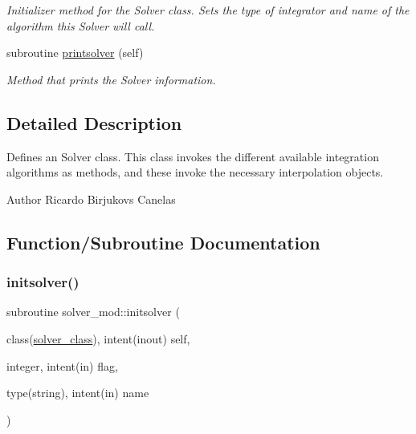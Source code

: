 \begin{DoxyCompactItemize}
\begin{DoxyCompactList}\small\item\em Initializer method for the Solver class. Sets the type of integrator and name of the algorithm this Solver will call. \end{DoxyCompactList}\item 
subroutine \mbox{\hyperlink{namespacesolver__mod_a54ea6899cce026a7a5da2dd05922628f}{printsolver}} (self)
\begin{DoxyCompactList}\small\item\em Method that prints the Solver information. \end{DoxyCompactList}\end{DoxyCompactItemize}


\subsection{Detailed Description}
Defines an Solver class. This class invokes the different available integration algorithms as methods, and these invoke the necessary interpolation objects. 

\begin{DoxyAuthor}{Author}
Ricardo Birjukovs Canelas 
\end{DoxyAuthor}


\subsection{Function/\+Subroutine Documentation}
\mbox{\label{namespacesolver__mod_a326292ff19880a914317109520b200b2}} 
\subsubsection{\texorpdfstring{initsolver()}{initsolver()}}
{\footnotesize\ttfamily subroutine solver\+\_\+mod\+::initsolver (\begin{DoxyParamCaption}\item[{class(\mbox{\hyperlink{structsolver__mod_1_1solver__class}{solver\+\_\+class}}), intent(inout)}]{self,  }\item[{integer, intent(in)}]{flag,  }\item[{type(string), intent(in)}]{name }\end{DoxyParamCaption})\hspace{0.3cm}{\ttfamily [private]}}



